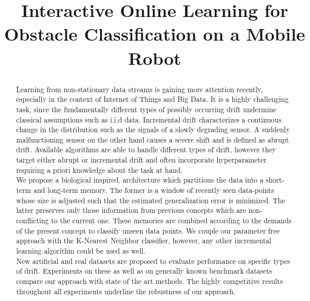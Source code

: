 \documentclass[conference]{IEEEtran}
\begin{document}
\title{Interactive Online Learning for Obstacle Classification on a Mobile Robot}


\author{
}



\maketitle



\begin{abstract}
Learning from non-stationary data streams is gaining more attention
recently, especially in the context of Internet of Things and Big Data.
It is a highly challenging task, since the fundamentally different types
of possibly occurring drift undermine classical assumptions such as
i.i.d data. Incremental drift characterizes a continuous change in the
distribution such as the signals of a slowly degrading sensor. A
suddenly malfunctioning sensor on the other hand causes a severe shift
and is defined as abrupt drift. Available algorithms are able to handle
different types of drift, however they target either abrupt or
incremental drift and often incorporate hyperparameter requiring a
priori knowledge about the task at hand.\\
We propose a biological inspired, architecture which partitions the data
into a short-term and long-term memory. The former is a window of
recently seen data-points whose size is adjusted such that the estimated
generalization error is minimized. The latter preserves only those
information from previous concepts which are non-conflicting to the
current one. These memories are combined according to the demands of the
present concept to classify unseen data points. We couple our parameter
free approach with the K-Nearest Neighbor classifier, however, any other
incremental learning algorithm could be used as well. \\
New artificial and real datasets are proposed to evaluate performance on
specific types of drift. Experiments on these as well as on generally
known benchmark datasets compare our approach with state of the art
methods. The highly competitive results throughout all experiments
underline the robustness of our approach.
\end{abstract}
\end{document}

